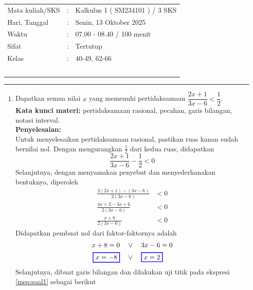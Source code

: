 \documentclass[10pt,openany,a4paper]{article}
\theoremstyle{definition}
\theoremstyle{definition}
\theoremstyle{plain}
\newenvironment{jawab}[2][tes]{
\textbf{Kata kunci materi:} #1.\\
\textbf{Penyelesaian:} #2
}{}
\begin{document}
    \begin{center}
	\begin{tabular}{lcl}
		Mata kuliah/SKS & : & Kalkulus 1 ( SM234101 ) / 3 SKS\\
		Hari, Tanggal & : & Senin, 13 Oktober 2025\\
		Waktu & : & 07.00 - 08.40 / 100 menit\\
		Sifat & : & Tertutup\\
		Kelas & : & 40-49, 62-66\\
  ~
	\end{tabular}
    
    \noindent\rule{\textwidth}{2.pt}
        \end{center}
    \begin{enumerate}
     \item Dapatkan semua nilai \(x\) yang memenuhi pertidaksamaan
    \(
        \dfrac{2x + 1}{3x - 6} < \dfrac{1}{2}.
    \)\\
\begin{jawab}[pertidaksamaan rasional, pecahan, garis bilangan, notasi interval]{
        ~\\
        Untuk menyelesaikan pertidaksamaan rasional, pastikan ruas kanan sudah bernilai nol. Dengan mengurangkan \(\frac{1}{2}\) dari kedua ruas, didapatkan
        \[
        \frac{2x + 1}{3x - 6} - \frac{1}{2} < 0
        \]
        Selanjutnya, dengan menyamakan penyebut dan menyederhanakan bentuknya, diperoleh
        \begin{align}
            \frac{2(2x+1)-(3x-6)}{2(3x-6)} &< 0\nonumber\\
             \frac{4x + 2 - 3x + 6}{2(3x - 6)} &< 0\nonumber \\
             \frac{x + 8}{2(3x - 6)} &< 0 \label{ineq:soal1}
        \end{align}
        Didapatkan pembuat nol dari faktor-faktornya adalah 
        \begin{align*}
            x+8 = 0 \quad &\vee\quad  3x - 6 = 0\\
            \colorlet{oldcolor}{.}
        \color{blue}
        \setlength{\fboxrule}{1pt} \boxed{\color{oldcolor}x=-8}\color{oldcolor}
         \quad &\vee\quad \colorlet{oldcolor}{.}
        \color{blue}
        \setlength{\fboxrule}{1pt} \boxed{\color{oldcolor}x=2}\color{oldcolor}
        \end{align*}
        Selanjutnya, dibuat garis bilangan dan dilakukan uji titik pada ekspresi \eqref{ineq:soal1} sebagai berikut
        \begin{itemize}

\end{itemize}}
\end{jawab}
\end{enumerate}
\end{document}
